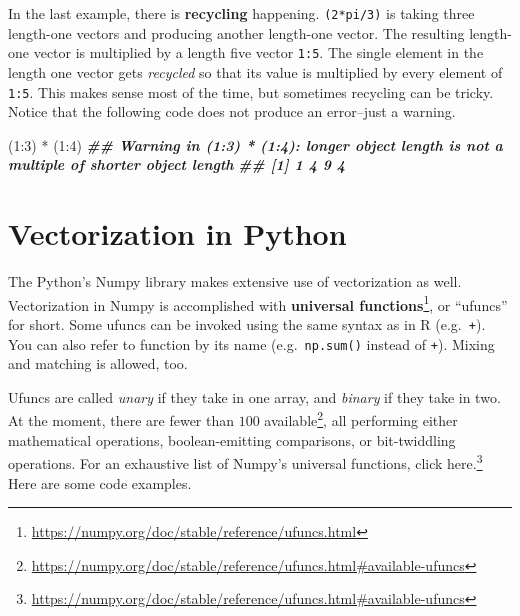 \documentclass[
  12pt,
]{krantz}
\makeatletter
\newenvironment{Shaded}{\begin{snugshade}}{\end{snugshade}}
\newcommand{\DecValTok}[1]{\textcolor[rgb]{0.06,0.06,0.06}{#1}}
\newcommand{\DocumentationTok}[1]{\textcolor[rgb]{0.37,0.37,0.37}{\textbf{\textit{#1}}}}
\newcommand{\NormalTok}[1]{#1}
\newcommand{\SpecialCharTok}[1]{\textcolor[rgb]{0,0,0}{#1}}
\renewcommand{\href}[2]{#2\footnote{\url{#1}}}
\newenvironment{kframe}{%
\medskip{}
\setlength{\fboxsep}{.8em}
 \def\at@end@of@kframe{}%
 \ifinner\ifhmode%
  \def\at@end@of@kframe{\end{minipage}}%
  \begin{minipage}{\columnwidth}%
 \fi\fi%
 \def\FrameCommand##1{\hskip\@totalleftmargin \hskip-\fboxsep
 \colorbox{shadecolor}{##1}\hskip-\fboxsep
     \hskip-\linewidth \hskip-\@totalleftmargin \hskip\columnwidth}%
 \MakeFramed {\advance\hsize-\width
   \@totalleftmargin\z@ \linewidth\hsize
   \@setminipage}}%
 {\par\unskip\endMakeFramed%
 \at@end@of@kframe}
\renewenvironment{Shaded}{\begin{kframe}}{\end{kframe}}
\makeatother
\begin{document}
In the last example, there is \textbf{recycling} happening. \texttt{(2*pi/3)} is taking three length-one vectors and producing another length-one vector. The resulting length-one vector is multiplied by a length five vector \texttt{1:5}. The single element in the length one vector gets \emph{recycled} so that its value is multiplied by every element of \texttt{1:5}.
This makes sense most of the time, but sometimes recycling can be tricky. Notice that the following code does not produce an error--just a warning.

\begin{Shaded}
\begin{Highlighting}[]
\NormalTok{(}\DecValTok{1}\SpecialCharTok{:}\DecValTok{3}\NormalTok{) }\SpecialCharTok{*}\NormalTok{ (}\DecValTok{1}\SpecialCharTok{:}\DecValTok{4}\NormalTok{)}
\DocumentationTok{\#\# Warning in (1:3) * (1:4): longer object length is not a multiple of shorter object length}
\DocumentationTok{\#\# [1] 1 4 9 4}
\end{Highlighting}
\end{Shaded}

\hypertarget{vectorization-in-python}{%
\section{Vectorization in Python}\label{vectorization-in-python}}

The Python's Numpy library makes extensive use of vectorization as well. Vectorization in Numpy is accomplished with \href{https://numpy.org/doc/stable/reference/ufuncs.html}{\textbf{universal functions}}, or ``ufuncs'' for short. Some ufuncs can be invoked using the same syntax as in R (e.g.~\texttt{+}). You can also refer to function by its name (e.g.~\texttt{np.sum()} instead of \texttt{+}). Mixing and matching is allowed, too.

Ufuncs are called \emph{unary} if they take in one array, and \emph{binary} if they take in two. At the moment, there are \href{https://numpy.org/doc/stable/reference/ufuncs.html\#available-ufuncs}{fewer than \(100\) available}, all performing either mathematical operations, boolean-emitting comparisons, or bit-twiddling operations. For an exhaustive list of Numpy's universal functions, \href{https://numpy.org/doc/stable/reference/ufuncs.html\#available-ufuncs}{click here.} Here are some code examples.
\end{document}
